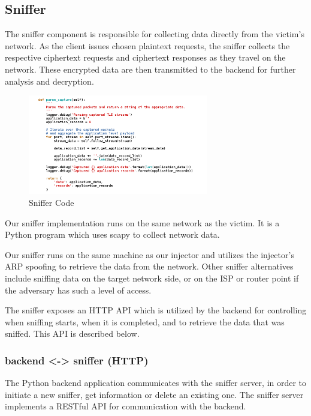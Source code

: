 \subsection{Sniffer}

The sniffer component is responsible for collecting data directly from the
victim's network. As the client issues chosen plaintext requests, the sniffer
collects the respective ciphertext requests and ciphertext responses as they
travel on the network. These encrypted data are then transmitted to the backend
for further analysis and decryption.

\begin{figure}[H] \caption{Sniffer Code} \centering
\includegraphics[width=0.7\textwidth]{diagrams/sniffer.png}\end{figure}

Our sniffer implementation runs on the same network as the victim. It is a
Python program which uses scapy \cite{scapy} to
collect network data.

Our sniffer runs on the same machine as our injector and utilizes the
injector's ARP spoofing to retrieve the data from the network. 
Other sniffer alternatives include sniffing data on the target network side, or
on the ISP or router point if the adversary has such a level of access.

The sniffer exposes an HTTP API which is utilized by the backend for
controlling when sniffing starts, when it is completed, and to retrieve the
data that was sniffed. This API is described below.


\subsubsection{backend <-> sniffer (HTTP)}

The Python backend application communicates with the sniffer server, in order
to initiate a new sniffer, get information or delete an existing one. The  sniffer 
server implements a RESTful API for communication with the backend.

